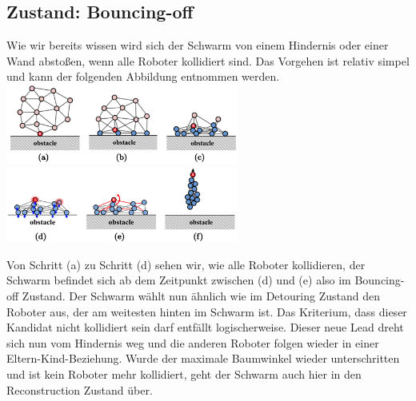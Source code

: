 \subsection{Zustand: Bouncing-off}

Wie wir bereits wissen wird sich der Schwarm von einem Hindernis oder einer Wand abstoßen, wenn alle
Roboter kollidiert sind. Das Vorgehen ist relativ simpel und kann der folgenden Abbildung entnommen werden.\\

\includegraphics[width=3in]{images/Screenshot 2023-02-20 at 1.32.00 PM.png}
\includegraphics[width=3in]{images/Screenshot 2023-02-20 at 1.32.24 PM.png}

Von Schritt (a) zu Schritt (d) sehen wir, wie alle Roboter kollidieren, der Schwarm befindet sich ab dem
Zeitpunkt zwischen (d) und (e) also im Bouncing-off Zustand. Der Schwarm wählt nun ähnlich wie im Detouring
Zustand den Roboter aus, der am weitesten hinten im Schwarm ist. Das Kriterium, dass dieser Kandidat nicht
kollidiert sein darf entfällt logischerweise. Dieser neue Lead dreht sich nun vom Hindernis weg und die
anderen Roboter folgen wieder in einer Eltern-Kind-Beziehung. Wurde der maximale Baumwinkel wieder
unterschritten und ist kein Roboter mehr kollidiert, geht der Schwarm auch hier in den Reconstruction Zustand
über.